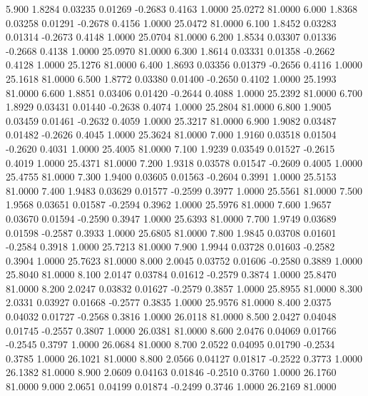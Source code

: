    5.900   1.8284   0.03235   0.01269  -0.2683   0.4163   1.0000  25.0272  81.0000
   6.000   1.8368   0.03258   0.01291  -0.2678   0.4156   1.0000  25.0472  81.0000
   6.100   1.8452   0.03283   0.01314  -0.2673   0.4148   1.0000  25.0704  81.0000
   6.200   1.8534   0.03307   0.01336  -0.2668   0.4138   1.0000  25.0970  81.0000
   6.300   1.8614   0.03331   0.01358  -0.2662   0.4128   1.0000  25.1276  81.0000
   6.400   1.8693   0.03356   0.01379  -0.2656   0.4116   1.0000  25.1618  81.0000
   6.500   1.8772   0.03380   0.01400  -0.2650   0.4102   1.0000  25.1993  81.0000
   6.600   1.8851   0.03406   0.01420  -0.2644   0.4088   1.0000  25.2392  81.0000
   6.700   1.8929   0.03431   0.01440  -0.2638   0.4074   1.0000  25.2804  81.0000
   6.800   1.9005   0.03459   0.01461  -0.2632   0.4059   1.0000  25.3217  81.0000
   6.900   1.9082   0.03487   0.01482  -0.2626   0.4045   1.0000  25.3624  81.0000
   7.000   1.9160   0.03518   0.01504  -0.2620   0.4031   1.0000  25.4005  81.0000
   7.100   1.9239   0.03549   0.01527  -0.2615   0.4019   1.0000  25.4371  81.0000
   7.200   1.9318   0.03578   0.01547  -0.2609   0.4005   1.0000  25.4755  81.0000
   7.300   1.9400   0.03605   0.01563  -0.2604   0.3991   1.0000  25.5153  81.0000
   7.400   1.9483   0.03629   0.01577  -0.2599   0.3977   1.0000  25.5561  81.0000
   7.500   1.9568   0.03651   0.01587  -0.2594   0.3962   1.0000  25.5976  81.0000
   7.600   1.9657   0.03670   0.01594  -0.2590   0.3947   1.0000  25.6393  81.0000
   7.700   1.9749   0.03689   0.01598  -0.2587   0.3933   1.0000  25.6805  81.0000
   7.800   1.9845   0.03708   0.01601  -0.2584   0.3918   1.0000  25.7213  81.0000
   7.900   1.9944   0.03728   0.01603  -0.2582   0.3904   1.0000  25.7623  81.0000
   8.000   2.0045   0.03752   0.01606  -0.2580   0.3889   1.0000  25.8040  81.0000
   8.100   2.0147   0.03784   0.01612  -0.2579   0.3874   1.0000  25.8470  81.0000
   8.200   2.0247   0.03832   0.01627  -0.2579   0.3857   1.0000  25.8955  81.0000
   8.300   2.0331   0.03927   0.01668  -0.2577   0.3835   1.0000  25.9576  81.0000
   8.400   2.0375   0.04032   0.01727  -0.2568   0.3816   1.0000  26.0118  81.0000
   8.500   2.0427   0.04048   0.01745  -0.2557   0.3807   1.0000  26.0381  81.0000
   8.600   2.0476   0.04069   0.01766  -0.2545   0.3797   1.0000  26.0684  81.0000
   8.700   2.0522   0.04095   0.01790  -0.2534   0.3785   1.0000  26.1021  81.0000
   8.800   2.0566   0.04127   0.01817  -0.2522   0.3773   1.0000  26.1382  81.0000
   8.900   2.0609   0.04163   0.01846  -0.2510   0.3760   1.0000  26.1760  81.0000
   9.000   2.0651   0.04199   0.01874  -0.2499   0.3746   1.0000  26.2169  81.0000
